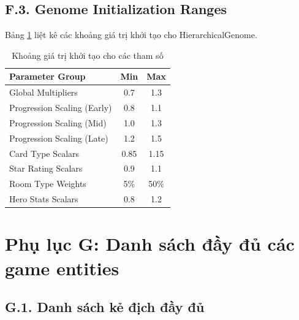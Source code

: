 \subsection*{F.3. Genome Initialization Ranges}

Bảng \ref{tab:genome_ranges} liệt kê các khoảng giá trị khởi tạo cho HierarchicalGenome.

\begin{table}[H]
    \centering
    \caption{Khoảng giá trị khởi tạo cho các tham số}
    \label{tab:genome_ranges}
    \begin{tabular}{l c c}
        \toprule
        \textbf{Parameter Group} & \textbf{Min} & \textbf{Max} \\
        \midrule
        Global Multipliers & 0.7 & 1.3 \\
        Progression Scaling (Early) & 0.8 & 1.1 \\
        Progression Scaling (Mid) & 1.0 & 1.3 \\
        Progression Scaling (Late) & 1.2 & 1.5 \\
        Card Type Scalars & 0.85 & 1.15 \\
        Star Rating Scalars & 0.9 & 1.1 \\
        Room Type Weights & 5\% & 50\% \\
        Hero Stats Scalars & 0.8 & 1.2 \\
        \bottomrule
    \end{tabular}
\end{table}

\section*{Phụ lục G: Danh sách đầy đủ các game entities}

\subsection*{G.1. Danh sách kẻ địch đầy đủ}

